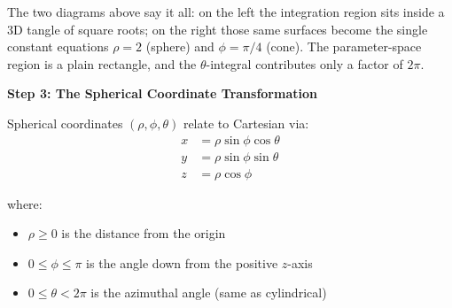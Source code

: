 \documentclass{ximera}
\begin{document}
\begin{problem}
\begin{center}
\end{center}

The two diagrams above say it all: on the left the integration region sits inside a 3D tangle of square roots; on the right those same surfaces become the single constant equations $\rho=2$ (sphere) and $\phi=\pi/4$ (cone).  The parameter-space region is a plain rectangle, and the $\theta$-integral contributes only a factor of $2\pi$.

\textbf{Step 3: The Spherical Coordinate Transformation}

Spherical coordinates $(\rho, \phi, \theta)$ relate to Cartesian via:
\begin{align*}
x &= \rho\sin\phi\cos\theta\\
y &= \rho\sin\phi\sin\theta\\
z &= \rho\cos\phi
\end{align*}

where:
\begin{itemize}
    \item $\rho \geq 0$ is the distance from the origin
    \item $0 \leq \phi \leq \pi$ is the angle down from the positive $z$-axis
    \item $0 \leq \theta < 2\pi$ is the azimuthal angle (same as cylindrical)
\end{itemize}


\end{problem}
\end{document}
